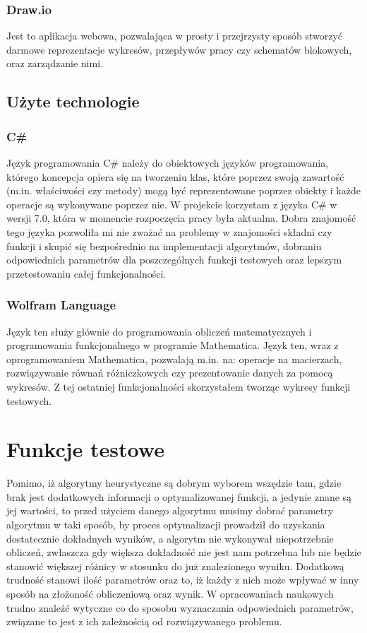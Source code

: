 \documentclass[twoside]{projektInzynierskiMS1}
\newcommand{\si}{ś}
\begin{document}
\subsubsection{Draw.io}
Jest to aplikacja webowa, pozwalająca w prosty i przejrzysty sposób stworzyć darmowe reprezentacje wykresów, przepływów pracy czy schematów blokowych, oraz zarządzanie nimi. 
	
	\subsection{Użyte technologie}
	\subsubsection{C\#}
Język programowania C\# należy do obiektowych języków programowania, którego koncepcja opiera się na tworzeniu klas, które poprzez swoją zawarto\si ć (m.in. wła\si ciwo\si ci czy metody) mogą być reprezentowane poprzez obiekty i każde operacje są wykonywane poprzez nie. W projekcie korzystam z języka C\# w wersji 7.0, która w momencie rozpoczęcia pracy była aktualna. Dobra znajomo\si ć tego języka pozwoliła mi nie zważać na problemy w znajomo\si ci składni czy funkcji i skupić się bezpo\si rednio na implementacji algorytmów, dobraniu odpowiednich parametrów dla poszczególnych funkcji testowych oraz lepszym przetestowaniu całej funkcjonalno\si ci.

\subsubsection{Wolfram Language}
Język ten służy głównie do programowania obliczeń matematycznych i programowania funkcjonalnego w programie Mathematica. Język ten, wraz z oprogramowaniem Mathematica, pozwalają m.in. na: operacje na macierzach, rozwiązywanie równań różniczkowych czy prezentowanie danych za pomocą wykresów. Z tej ostatniej funkcjonalno\si ci skorzystałem tworząc wykresy funkcji testowych.

\section{Funkcje testowe}
Pomimo, iż algorytmy heurystyczne są dobrym wyborem wszędzie tam, gdzie brak jest dodatkowych informacji o optymalizowanej funkcji, a jedynie znane są jej warto\si ci, to przed użyciem danego algorytmu musimy dobrać parametry algorytmu w taki sposób, by proces optymalizacji prowadził do uzyskania dostatecznie dokładnych wyników, a algorytm nie wykonywał niepotrzebnie obliczeń, zwłaszcza gdy większa dokładno\si ć nie jest nam potrzebna lub nie będzie stanowić większej różnicy w stosunku do już znalezionego wyniku. Dodatkową trudno\si ć stanowi ilo\si ć parametrów oraz to, iż każdy z nich może wpływać w inny sposób na złożono\si ć obliczeniową oraz wynik. W opracowaniach naukowych trudno znaleźć wytyczne co do sposobu wyznaczania odpowiednich parametrów, związane to jest z ich zależno\si cią od rozwiązywanego problemu. \\
\end{document}
